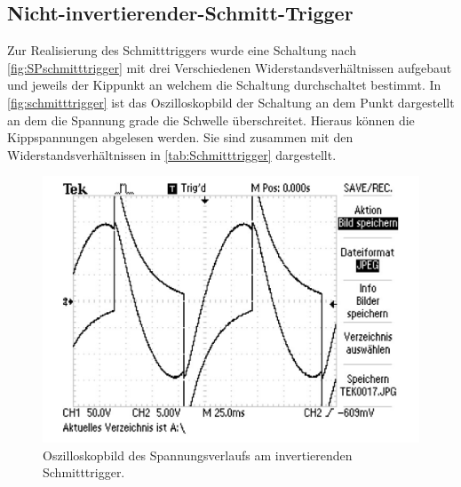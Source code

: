   \subsection{Nicht-invertierender-Schmitt-Trigger}
  Zur Realisierung des Schmitttriggers wurde eine Schaltung nach \autoref{fig:SPschmitttrigger} mit 
  drei Verschiedenen Widerstandsverhältnissen aufgebaut und jeweils der Kippunkt an welchem die Schaltung
  durchschaltet bestimmt. In \autoref{fig:schmitttrigger} ist das Oszilloskopbild der Schaltung an dem Punkt dargestellt 
  an dem die Spannung grade die Schwelle überschreitet. Hieraus können die Kippspannungen abgelesen werden.
  Sie sind zusammen mit den Widerstandsverhältnissen in \autoref{tab:Schmitttrigger} dargestellt.
\label{sec:schmitt}
\begin{figure}
    \centering
    \includegraphics[width=1\textwidth]{content/grafiken/schmittTrigger/TEK0017.pdf}
    \caption{Oszilloskopbild des Spannungsverlaufs am invertierenden Schmitttrigger.}
    \label{fig:schmitttrigger}
  \end{figure}

